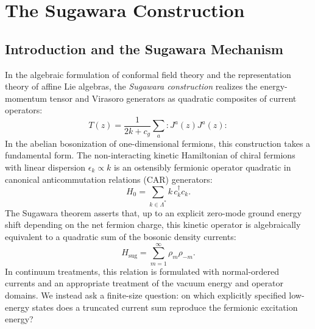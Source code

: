 \chapter{The Sugawara Construction}
\label{ch:sugawara}

\section{Introduction and the Sugawara Mechanism}

In the algebraic formulation of conformal field theory and the representation theory of affine Lie algebras, the \emph{Sugawara construction} realizes the energy-momentum tensor and Virasoro generators as quadratic composites of current operators:
\begin{equation}
T(z) = \frac{1}{2k + c_g} \sum_a : \! J^a(z) J^a(z) \! :
\end{equation}
In the abelian bosonization of one-dimensional fermions, this construction takes a fundamental form. The non-interacting kinetic Hamiltonian of chiral fermions with linear dispersion $\epsilon_k \propto k$ is an ostensibly fermionic operator quadratic in canonical anticommutation relations (CAR) generators:
\begin{equation}
\label{eq:fermionic_kinetic_intro}
H_0 = \sum_{k \in \Lambda^*} k\, c_k^\dagger c_k.
\end{equation}
The Sugawara theorem asserts that, up to an explicit zero-mode ground energy shift depending on the net fermion charge, this kinetic operator is algebraically equivalent to a quadratic sum of the bosonic density currents:
\begin{equation}
\label{eq:sugawara_heuristic_intro}
H_{\mathrm{sug}} = \sum_{m=1}^\infty \rho_m \rho_{-m}.
\end{equation}
In continuum treatments, this relation is formulated with normal-ordered currents and an appropriate treatment of the vacuum energy and operator domains. We instead ask a finite-size question: on which explicitly specified low-energy states does a truncated current sum reproduce the fermionic excitation energy?

